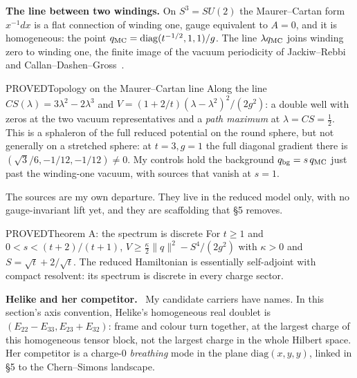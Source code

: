 \textbf{The line between two windings.} On $S^3=SU(2)$ the Maurer--Cartan form $x^{-1}dx$ is a flat connection of winding
one, gauge equivalent to $A=0$, and it is homogeneous: the point $q_{\rm MC}=\mathrm{diag}(t^{-1/2},1,1)/g$. The line
$\lambda q_{\rm MC}$ joins winding zero to winding one, the finite image of the vacuum periodicity of Jackiw--Rebbi and
Callan--Dashen--Gross~\cite{JackiwRebbi76,CallanDashenGross76}.

\begin{claim}{PROVED}{Topology on the Maurer--Cartan line}\label{b:mc}
Along the line $CS(\lambda)=3\lambda^2-2\lambda^3$ and $V=(1+2/t)(\lambda-\lambda^2)^2/(2g^2)$: a double well with zeros
at the two vacuum representatives and a \emph{path maximum} at $\lambda=CS=\tfrac12$. This is a sphaleron of the
full reduced potential on the round sphere, but not generally on a stretched sphere: at $t=3,g=1$ the full diagonal
gradient there is $(\sqrt3/6,-1/12,-1/12)\ne0$. My controls hold the background $q_{\rm bg}=s\,q_{\rm MC}$
just past the winding-one vacuum, with sources that vanish at $s=1$.
\end{claim}

The sources are my own departure. They live in the reduced model only, with no gauge-invariant lift yet, and they are
scaffolding that \S5 removes.

\begin{claim}{PROVED}{Theorem A: the spectrum is discrete}\label{b:thmA}
For $t\ge1$ and $0<s<(t+2)/(t+1)$, $V\ge\tfrac\kappa2\|q\|^2-S^4/(2g^2)$ with $\kappa>0$ and $S=\sqrt t+2/\sqrt t$. The
reduced Hamiltonian is essentially self-adjoint with compact resolvent: its spectrum is discrete in every charge sector.
\end{claim}

\textbf{Helike and her competitor.}\  My candidate carriers have names. In this section's axis convention,
Helike's homogeneous real doublet is $(E_{22}-E_{33},E_{23}+E_{32})$: frame and colour turn together, at the
largest charge of this homogeneous tensor block, not the largest charge in the whole Hilbert space.
Her competitor is a charge-0 \emph{breathing} mode in the plane $\mathrm{diag}(x,y,y)$, linked in \S5 to the Chern--Simons landscape.

